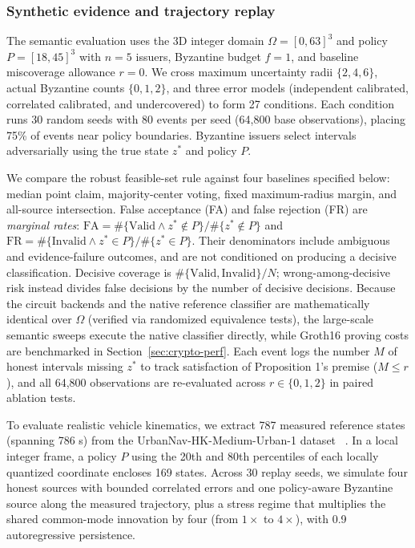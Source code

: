 \subsubsection{Synthetic evidence and trajectory replay}
The semantic evaluation uses the 3D integer domain $\Omega = [0, 63]^3$ and policy $P = [18, 45]^3$ with $n = 5$ issuers, Byzantine budget $f = 1$, and baseline miscoverage allowance $r = 0$. We cross maximum uncertainty radii $\{2, 4, 6\}$, actual Byzantine counts $\{0, 1, 2\}$, and three error models (independent calibrated, correlated calibrated, and undercovered) to form 27 conditions. Each condition runs 30 random seeds with 80 events per seed (64,800 base observations), placing 75\% of events near policy boundaries. Byzantine issuers select intervals adversarially using the true state $z^*$ and policy $P$.

We compare the robust feasible-set rule against four baselines specified below: median point claim, majority-center voting, fixed maximum-radius margin, and all-source intersection. False acceptance (FA) and false rejection (FR) are \emph{marginal rates}: $\mathrm{FA}=\#\{\mathrm{Valid}\wedge z^*\notin P\}/\#\{z^*\notin P\}$ and $\mathrm{FR}=\#\{\mathrm{Invalid}\wedge z^*\in P\}/\#\{z^*\in P\}$. Their denominators include ambiguous and evidence-failure outcomes, and are not conditioned on producing a decisive classification. Decisive coverage is $\#\{\mathrm{Valid},\mathrm{Invalid}\}/N$; wrong-among-decisive risk instead divides false decisions by the number of decisive decisions. Because the circuit backends and the native reference classifier are mathematically identical over $\Omega$ (verified via randomized equivalence tests), the large-scale semantic sweeps execute the native classifier directly, while Groth16 proving costs are benchmarked in Section~\ref{sec:crypto-perf}. Each event logs the number $M$ of honest intervals missing $z^*$ to track satisfaction of Proposition 1's premise ($M \le r$), and all 64,800 observations are re-evaluated across $r \in \{0, 1, 2\}$ in paired ablation tests.

To evaluate realistic vehicle kinematics, we extract 787 measured reference states (spanning 786 s) from the UrbanNav-HK-Medium-Urban-1 dataset ~\citep{UrbanNav}. In a local integer frame, a policy $P$ using the 20th and 80th percentiles of each locally quantized coordinate encloses 169 states. Across 30 replay seeds, we simulate four honest sources with bounded correlated errors and one policy-aware Byzantine source along the measured trajectory, plus a stress regime that multiplies the shared common-mode innovation by four (from $1\times$ to $4\times$), with 0.9 autoregressive persistence.


